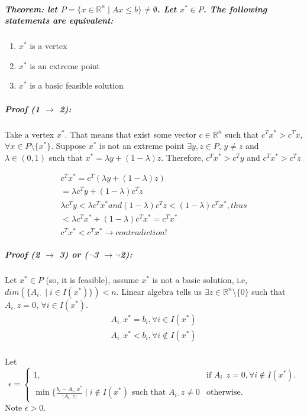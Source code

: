 \documentclass[main]{subfiles}
\begin{document}
\subparagraph{Theorem: let $P=\{x \in \mathbb{R}^{n} \mid Ax \leq b \} \neq
\emptyset$. Let $x^{*} \in P$. The following statements are equivalent:}
\begin{enumerate}
\item $x^{*}$ is a vertex
\item $x^{*}$ is an extreme point
\item $x^{*}$ is a basic feasible solution
\end{enumerate}

\subparagraph{Proof (1 $\rightarrow$ 2):}
Take a vertex $x^{*}$. That means that exist some vector $c \in \mathbb{R}^{n}$
such that $c^{T}x^{*} > c^{T}x$, $\forall x \in P\setminus\{x^{*}\}$. Suppose
$x^{*}$ is not an extreme point $\exists y, z \in P$, $y \neq z$ and $\lambda
\in (0,1)$ such that $x^{*} = \lambda y + (1 - \lambda) z$.
Therefore, $c^{T}x^{*} > c^{T}y$ and $c^{T}x^{*} > c^{T}z$

\begin{gather*}
c^{T}x^{*} = c^{T}(\lambda y + (1 - \lambda)z) \\
= \lambda c^{T}y + (1 - \lambda) c^{T}z \\
\lambda c^{T}y < \lambda c^{T}x^{*} and (1 - \lambda) c^{T}z < (1 - \lambda)
c^{T}x^*, thus \\
< \lambda c^{T}x^{*} + (1-\lambda) c^{T}x^{*} = c^{T}x^{*} \\
c^{T}x^{*} < c^{T}x^{*} \rightarrow contradiction!
\end{gather*}

\subparagraph{Proof (2 $\rightarrow$ 3) or ($\neg$3 $\rightarrow \neg$2):} Let
$x^{*} \in P$ (so, it is feasible), assume $x^{*}$ is not a basic solution,
i.e, $dim(\{A_{i\cdot} \mid i \in I(x^{*})\}) < n$.
Linear algebra tells us $\exists z \in \mathbb{R}^{n} \setminus \{0\}$ such
that $A_{i\cdot} z = 0$, $\forall i \in I(x^{*})$.
\begin{gather*}
A_{i\cdot} x^{*} = b_{i}, \forall i \in I(x^{*}) \\
A_{i\cdot} x^{*} < b_{i}, \forall i \notin I(x^{*}) \\
\end{gather*}

Let
\begin{equation}
  \epsilon=\begin{cases}
    1, & \text{if $A_{i\cdot}z = 0, \forall i \notin I(x^{*})$}.\\
    \min\{\frac{b_{i} - A_{i\cdot}x^{*}}{|A_{i\cdot}z|} \mid i \notin I(x^{*})
    \text{ such that } A_{i\cdot}z \neq 0 & \text{otherwise}.
  \end{cases}
\end{equation}
Note $\epsilon > 0$.
\end{document}
